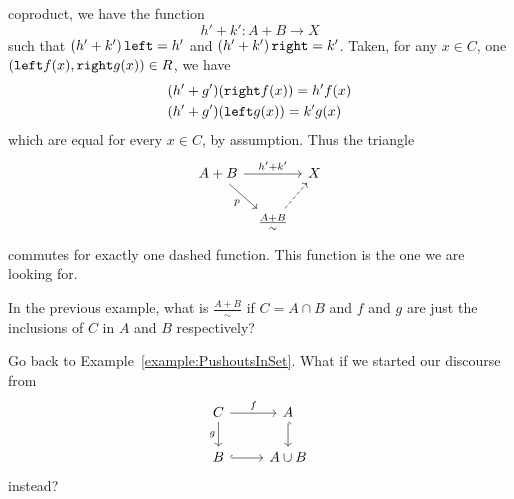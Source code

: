 \begin{example}
  coproduct, we have the function
  \[h' + k' : A + B \to X\] such that
  \(\left(h' + k'\right) \mathtt{left} = h'\) and
  \(\left(h' + k'\right) \mathtt{right} = k'\). Taken, for any \(x \in C\), one
  \((\mathtt{left} f(x), \mathtt{right} g(x)) \in R\), we have
  \begin{align*}
    & (h'+g')(\mathtt{right} f(x)) = h'f(x) \\
    & (h'+g')(\mathtt{left} g(x)) = k'g(x) 
  \end{align*}
  which are equal for every \(x \in C\), by
  assumption.  Thus the triangle
  \[\begin{tikzcd}[column sep=tiny]
      A+B \ar["{h'+k'}", rr] \ar["p", dr, swap] & & X \\
      & \frac{A+B}{\sim} \ar[ur, dashed, swap]
    \end{tikzcd}\] commutes for exactly one dashed function. This
  function is the one we are looking for. 
\end{example}

\begin{exercise}
  In the previous example, what is \(\frac{A+B}{\sim}\) if
  \(C = A \cap B\) and \(f\) and \(g\) are just the inclusions of \(C\)
  in \(A\) and \(B\) respectively? 
\end{exercise}

\begin{exercise}
  Go back to Example~\ref{example:PushoutsInSet}. What if we started our
  discourse from
  \[\begin{tikzcd}
      C \ar["f", r] \ar["g", d, swap]  & A \ar[d, hookrightarrow] \\
      B \ar[r, hookrightarrow] & A \cup B
    \end{tikzcd}\] instead?
\end{exercise}

